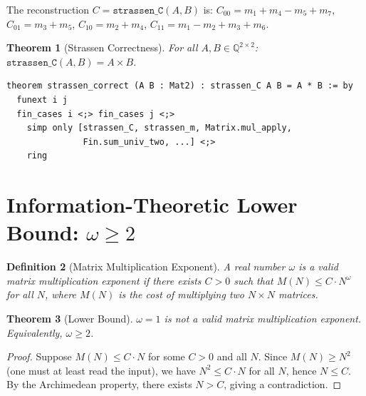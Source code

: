 \documentclass[11pt,a4paper]{article}
\newtheorem{theorem}{Theorem}[section]
\newtheorem{definition}[theorem]{Definition}
\begin{document}
The reconstruction $C = \texttt{strassen\_C}(A, B)$ is:
$C_{00} = m_1 + m_4 - m_5 + m_7$,
$C_{01} = m_3 + m_5$,
$C_{10} = m_2 + m_4$,
$C_{11} = m_1 - m_2 + m_3 + m_6$.

\begin{theorem}[Strassen Correctness]
\label{thm:strassen}
For all $A, B \in \mathbb{Q}^{2 \times 2}$:
$\texttt{strassen\_C}(A, B) = A \times B$.
\end{theorem}

\begin{lstlisting}[language=Lean, caption={Lean~4 proof of Strassen correctness}]
theorem strassen_correct (A B : Mat2) : strassen_C A B = A * B := by
  funext i j
  fin_cases i <;> fin_cases j <;>
    simp only [strassen_C, strassen_m, Matrix.mul_apply,
               Fin.sum_univ_two, ...] <;>
    ring
\end{lstlisting}



\section{Information-Theoretic Lower Bound: $\omega \geq 2$}
\label{sec:omega-lower}

\begin{definition}[Matrix Multiplication Exponent]
\label{def:exponent}
A real number $\omega$ is a \emph{valid matrix multiplication exponent}
if there exists $C > 0$ such that $M(N) \leq C \cdot N^{\omega}$ for
all $N$, where $M(N)$ is the cost of multiplying two $N \times N$
matrices.
\end{definition}

\begin{theorem}[Lower Bound]
\label{thm:omega-lb}
$\omega = 1$ is not a valid matrix multiplication exponent. Equivalently,
$\omega \geq 2$.
\end{theorem}

\begin{proof}
Suppose $M(N) \leq C \cdot N$ for some $C > 0$ and all $N$.
Since $M(N) \geq N^2$ (one must at least read the input), we have
$N^2 \leq C \cdot N$ for all $N$, hence $N \leq C$. By the Archimedean
property, there exists $N > C$, giving a contradiction.
\end{proof}
\end{document}
